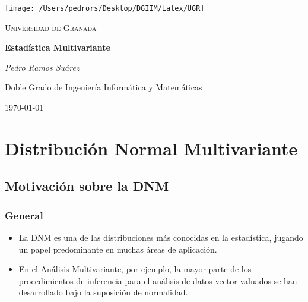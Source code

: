 \documentclass[11pt,a4paper]{article}
\begin{document}
\begin{titlepage}
\centering
\texttt{[image: /Users/pedrors/Desktop/DGIIM/Latex/UGR]}\par\vspace{1cm}
{\scshape\LARGE Universidad de Granada \par}
\vspace{1cm}
\vspace{1.5cm}
{\huge\bfseries Estadística Multivariante\par}
\vspace{2cm}
{\Large\itshape Pedro Ramos Suárez\par}
\vfill
Doble Grado de Ingeniería Informática y Matemáticas
\vfill
{\large \today\par}
\end{titlepage}

\tableofcontents
\newpage

\section{Distribución Normal Multivariante}

\subsection{Motivación sobre la DNM}

\subsubsection{General}
\begin{itemize}
\item La DNM es una de las distribuciones más conocidas en la estadística, jugando un papel predominante en muchas áreas de aplicación.

\item En el Análisis Multivariante, por ejemplo, la mayor parte de los procedimientos de inferencia para el análisis de datos vector-valuados se han desarrollado bajo la suposición de normalidad.
\end{itemize}
\end{document}

